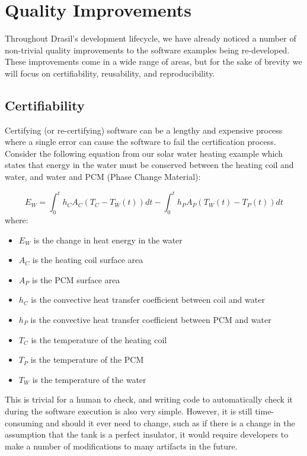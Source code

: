 \documentclass[sigconf]{acmart}
\newcommand{\authornt}[3]{\textcolor{#1}{[#3 ---#2]}}
\newcommand{\authornt}[3]{}
\newcommand{\wss}[1]{\authornt{blue}{SS}{#1}} %
\begin{document}
{\section{Quality Improvements} \label{SecQuality}

Throughout Drasil's development lifecycle, we have already noticed a number of 
non-trivial quality improvements to the software examples being re-developed. 
These improvements come in a wide range of areas, but for the sake of brevity 
we will focus on certifiability, reusability, and reproducibility.

\subsection{Certifiability}

Certifying (or re-certifying) software can be a lengthy and expensive process
where a single error can cause the software to fail the certification process.
Consider the following equation from our solar water heating example which
states that energy in the water must be conserved between the heating coil and
water, and water and PCM (Phase Change Material):

\begin{equation*}
E_W = \int_{0}^{t} h_C A_C (T_C - T_W(t)) dt - \int_{0}^{t} h_P A_P (T_W(t) - T_P(t)) dt
\end{equation*}
\noindent where:
\begin{itemize}
    \item $E_W$ is the change in heat energy in the water
    \item $A_C$ is the heating coil surface area
    \item $A_P$ is the PCM surface area
    \item $h_C$ is the convective heat transfer coefficient between coil and 
    water
    \item $h_P$ is the convective heat transfer coefficient between PCM and 
    water 
    \item $T_C$ is the temperature of the heating coil
    \item $T_P$ is the temperature of the PCM
    \item $T_W$ is the temperature of the water
\end{itemize}

This is trivial for a human to check, and writing code to automatically check it
during the software execution is also very simple. However, it is still
time-consuming and should it ever need to change, such as if there is a change
in the assumption that the tank is a perfect insulator, it would require
developers to make a number of modifications to many artifacts in the future.

}
\end{document}
